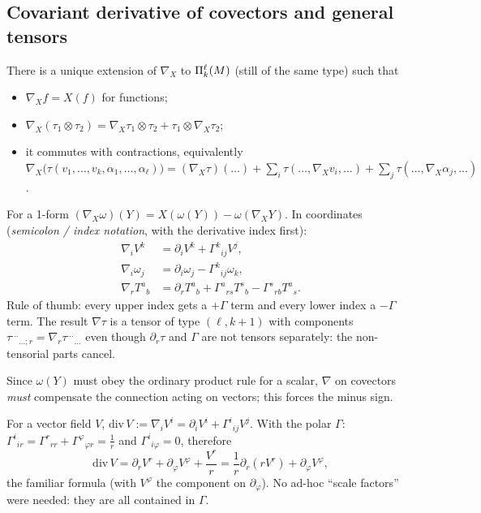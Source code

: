 \subsection{Covariant derivative of covectors and general tensors}
\begin{formal}
There is a unique extension of $\nabla_X$ to $\Pi^{\ell}_{k}(M)$ (still of the same type) such that
\begin{itemize}[nosep]
\item $\nabla_Xf=X(f)$ for functions;
\item $\nabla_X(\tau_1\otimes\tau_2)=\nabla_X\tau_1\otimes\tau_2+\tau_1\otimes\nabla_X\tau_2$;
\item it commutes with contractions, equivalently
$\nabla_X\big(\tau(v_1,\dots,v_k,\alpha_1,\dots,\alpha_\ell)\big)=(\nabla_X\tau)(\dots)+\sum_i\tau(\dots,\nabla_Xv_i,\dots)+\sum_j\tau(\dots,\nabla_X\alpha_j,\dots)$.
\end{itemize}
For a 1-form $(\nabla_X\omega)(Y)=X(\omega(Y))-\omega(\nabla_XY)$. In coordinates (\emph{semicolon / index notation}, with the derivative index first):
\begin{align*}
\nabla_iV^k&=\partial_iV^k+\Gamma^k{}_{ij}V^j,\\
\nabla_i\omega_j&=\partial_i\omega_j-\Gamma^k{}_{ij}\omega_k,\\
\nabla_r T^{a}{}_{b}&=\partial_rT^a{}_b+\Gamma^a{}_{rs}T^s{}_b-\Gamma^s{}_{rb}T^a{}_s .
\end{align*}
Rule of thumb: every upper index gets a $+\Gamma$ term and every lower index a $-\Gamma$ term. The result $\nabla\tau$ is a tensor of type $(\ell,k+1)$ with components $\tau^{\dots}{}_{\dots;r}=\nabla_r\tau^{\dots}{}_{\dots}$ even though $\partial_r\tau$ and $\Gamma$ are not tensors separately: the non-tensorial parts cancel.
\end{formal}
\begin{intuition}
Since $\omega(Y)$ must obey the ordinary product rule for a scalar, $\nabla$ on covectors \emph{must} compensate the connection acting on vectors; this forces the minus sign.
\end{intuition}

\begin{example}\label{ex:polardivconn}
For a vector field $V$, $\mathrm{div}\,V:=\nabla_iV^i=\partial_iV^i+\Gamma^i{}_{ij}V^j$. With the polar $\Gamma$: $\Gamma^i{}_{ir}=\Gamma^r{}_{rr}+\Gamma^\varphi{}_{\varphi r}=\frac1r$ and $\Gamma^i{}_{i\varphi}=0$, therefore
\[
\mathrm{div}\,V=\partial_rV^r+\partial_\varphi V^\varphi+\frac{V^r}{r}=\frac1r\partial_r(rV^r)+\partial_\varphi V^\varphi ,
\]
the familiar formula (with $V^\varphi$ the component on $\partial_\varphi$). No ad-hoc ``scale factors'' were needed: they are all contained in $\Gamma$.
\end{example}
